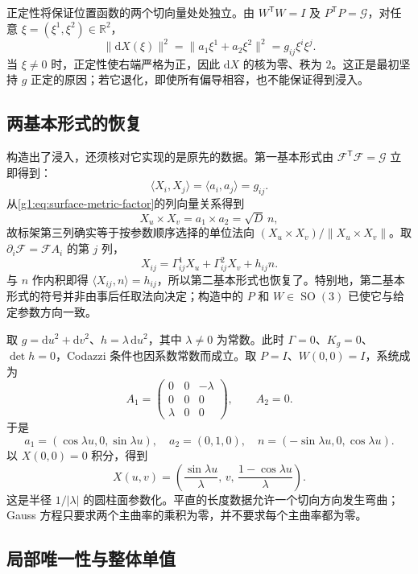 \ProseParagraphBreak

正定性将保证位置函数的两个切向量处处独立。由 \(W^{\mathsf T}W=I\) 及 \(P^{\mathsf T}P=\mathcal G\)，对任意 \(\xi=(\xi^1,\xi^2)\in\mathbb R^2\)，
\[
	\|\mathrm{d}X(\xi)\|^2
	=\|a_1\xi^1+a_2\xi^2\|^2
	=g_{ij}\xi^i\xi^j.
\]
当 \(\xi\ne0\) 时，正定性使右端严格为正，因此 \(\mathrm{d}X\) 的核为零、秩为 \(2\)。这正是最初坚持 \(g\) 正定的原因；若它退化，即使所有偏导相容，也不能保证得到浸入。

\subsection{两基本形式的恢复}
\label{g1:subsec:0804:06}

构造出了浸入，还须核对它实现的是原先的数据。第一基本形式由 \(\mathcal F^{\mathsf T}\mathcal F=\mathcal G\) 立即得到：
\[
	\langle X_i,X_j\rangle=\langle a_i,a_j\rangle=g_{ij}.
\]
从\eqref{g1:eq:surface-metric-factor}的列向量关系得到
\[
	X_u\times X_v=a_1\times a_2=\sqrt D\,n,
\]
故标架第三列确实等于按参数顺序选择的单位法向 \((X_u\times X_v)/\|X_u\times X_v\|\)。取 \(\partial_i\mathcal F=\mathcal F A_i\) 的第 \(j\) 列，
\[
	X_{ij}=\Gamma^1_{ij}X_u+\Gamma^2_{ij}X_v+h_{ij}n.
\]
与 \(n\) 作内积即得 \(\langle X_{ij},n\rangle=h_{ij}\)，所以第二基本形式也恢复了。特别地，第二基本形式的符号并非由事后任取法向决定；构造中的 \(P\) 和 \(W\in \operatorname{SO}(3)\) 已使它与给定参数方向一致。

\begin{example}
	\label{g1:exm:fundamental-cylinder-data}
	取 \(g=\mathrm{d}u^2+\mathrm{d}v^2\)、\(h=\lambda\,\mathrm{d}u^2\)，其中 \(\lambda\ne0\) 为常数。此时 \(\Gamma=0\)、\(K_g=0\)、\(\det h=0\)，Codazzi 条件也因系数常数而成立。取 \(P=I\)、\(W(0,0)=I\)，系统成为
	\[
		A_1=\begin{pmatrix}0&0&-\lambda\\0&0&0\\\lambda&0&0\end{pmatrix},
		\qquad A_2=0.
	\]
	于是
	\[
		a_1=(\cos\lambda u,0,\sin\lambda u),\quad
		a_2=(0,1,0),\quad n=(-\sin\lambda u,0,\cos\lambda u).
	\]
	以 \(X(0,0)=0\) 积分，得到
	\[
		X(u,v)=\left(\frac{\sin\lambda u}{\lambda},\,v,\,
		\frac{1-\cos\lambda u}{\lambda}\right).
	\]
	这是半径 \(1/|\lambda|\) 的圆柱面参数化。平直的长度数据允许一个切向方向发生弯曲；Gauss 方程只要求两个主曲率的乘积为零，并不要求每个主曲率都为零。
\end{example}

\subsection{局部唯一性与整体单值}
\label{g1:subsec:0804:07}

